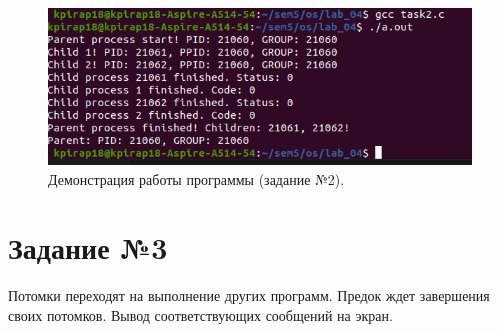 \documentclass[12pt]{report}
\begin{document}
\begin{figure}[H]

	\centering

	\includegraphics[width=\linewidth]{img/p2.png}
	\caption{Демонстрация работы программы (задание №2).}

	\label{fig:p2}

\end{figure}

\section*{Задание №3}

Потомки переходят на выполнение других программ. Предок ждет завершения своих потомков. Вывод соответствующих сообщений на экран.
\end{document}
